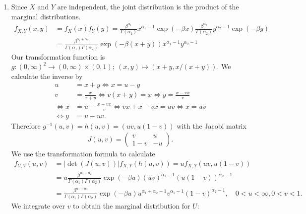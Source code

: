 \begin{solution}

\phantom{}

\begin{enumerate}[label = (\alph*)]
    \item
    Since $X$ and $Y$ are independent, the joint distribution is the product of
    the marginal distributions.
    \begin{align*}
      f_{X,Y}(x,y) &= f_X(x)f_Y(y) = \frac{\beta^{\alpha_1}}{\Gamma(\alpha_1)}x^{\alpha_1 - 1}\exp(-\beta x)
      \frac{\beta^{\alpha_2}}{\Gamma(\alpha_2)}y^{\alpha_2 - 1}\exp(-\beta y) \\
      &= \frac{\beta^{\alpha_1 + \alpha_2}}{\Gamma(\alpha_1)\Gamma(\alpha_2)}\exp(-\beta (x+y))x^{\alpha_1 - 1}y^{\alpha_2 - 1}
    \end{align*}
    Our transformation function is $g: (0,\infty)^2 \to (0,\infty)\times (0,1); \ (x,y) \mapsto (x+y, x/(x+y))$.
    We calculate the inverse by
    \begin{align*}
      u &= x + y \iff x = u - y \\
      v &= \frac{x}{x+y} \iff v(x + y) = x \iff y = \frac{x - vx}{v} \\
      \iff x &= u - \frac{x - vx}{v} \iff vx + x -vx = uv \iff x = uv \\
      \iff y &= u - uv.
    \end{align*}
    Therefore $g^{-1}(u,v) = h(u,v) = (uv, u(1-v))$ with the Jacobi matrix
    \begin{align*}
      J(u,v) = \begin{pmatrix}
        v & u \\ 1 -v & -u
      \end{pmatrix}.
    \end{align*}
    We use the transformation formula to calculate
    \begin{align*}
      f_{U,V}(u,v) &= |\det(J(u,v))|f_{X,Y}(h(u,v))
      = uf_{X,Y}(uv, u(1-v)) \\
      &= u\frac{\beta^{\alpha_1 + \alpha_2}}{\Gamma(\alpha_1)\Gamma(\alpha_2)}
      \exp(-\beta u)(uv)^{\alpha_1 - 1}(u(1-v))^{\alpha_2 - 1} \\
      &= \frac{\beta^{\alpha_1 + \alpha_2}}{\Gamma(\alpha_1)\Gamma(\alpha_2)}
      \exp(-\beta u)u^{\alpha_1 + \alpha_2 - 1}v^{\alpha_1 - 1}(1-v)^{\alpha_2 - 1},
      \quad 0 < u < \infty, 0 < v < 1.
    \end{align*}
    We integrate over $v$ to obtain the marginal distribution for $U$:
    \begin{align*}

\end{align*}
\end{enumerate}
\end{solution}
